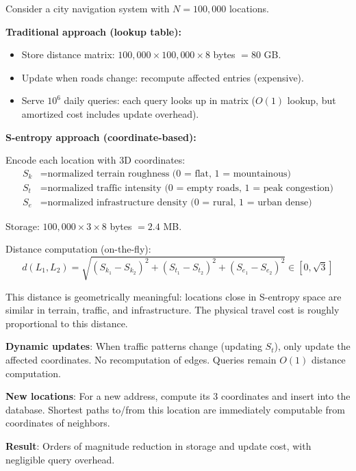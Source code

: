 \documentclass[twocolumn,11pt,a4paper]{article}
\newcommand{\Sk}{S_k}
\newcommand{\St}{S_t}
\newcommand{\Se}{S_e}
\begin{document}
\begin{application}

Consider a city navigation system with $N = 100,000$ locations.

\textbf{Traditional approach (lookup table):}
\begin{itemize}[nosep]
  \item Store distance matrix: $100,000 \times 100,000 \times 8$ bytes $= 80$ GB.
  \item Update when roads change: recompute affected entries (expensive).
  \item Serve $10^6$ daily queries: each query looks up in matrix ($O(1)$ lookup, but amortized cost includes update overhead).
\end{itemize}

\textbf{S-entropy approach (coordinate-based):}

Encode each location with 3D coordinates:
\begin{align}
\Sk &= \text{normalized terrain roughness (0 = flat, 1 = mountainous)} \\
\St &= \text{normalized traffic intensity (0 = empty roads, 1 = peak congestion)} \\
\Se &= \text{normalized infrastructure density (0 = rural, 1 = urban dense)}
\end{align}

Storage: $100,000 \times 3 \times 8$ bytes $= 2.4$ MB.

Distance computation (on-the-fly):
\begin{equation}
d(L_1, L_2) = \sqrt{(\Sk_1 - \Sk_2)^2 + (\St_1 - \St_2)^2 + (\Se_1 - \Se_2)^2} \in [0, \sqrt{3}]
\end{equation}

This distance is geometrically meaningful: locations close in S-entropy space are similar in terrain, traffic, and infrastructure. The physical travel cost is roughly proportional to this distance.

\textbf{Dynamic updates}: When traffic patterns change (updating $\St$), only update the affected coordinates. No recomputation of edges. Queries remain $O(1)$ distance computation.

\textbf{New locations}: For a new address, compute its 3 coordinates and insert into the database. Shortest paths to/from this location are immediately computable from coordinates of neighbors.

\textbf{Result}: Orders of magnitude reduction in storage and update cost, with negligible query overhead.
\end{application}
\end{document}
